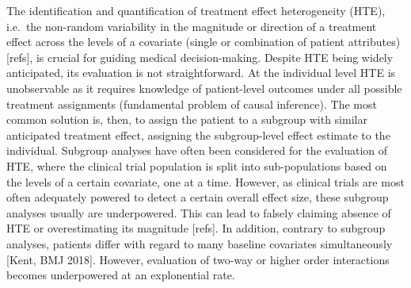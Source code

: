 \documentclass[
]{book}
\begin{document}
The identification and quantification of treatment effect heterogeneity (HTE),
i.e.~the non-random variability in the magnitude or direction of a treatment
effect across the levels of a covariate (single or combination of patient
attributes) {[}refs{]}, is crucial for guiding medical decision-making. Despite HTE
being widely anticipated, its evaluation is not straightforward. At the
individual level HTE is unobservable as it requires knowledge of patient-level
outcomes under all possible treatment assignments (fundamental problem of causal
inference). The most common solution is, then, to assign the patient to a
subgroup with similar anticipated treatment effect, assigning the subgroup-level
effect estimate to the individual. Subgroup analyses have often been considered
for the evaluation of HTE, where the clinical trial population is split into
sub-populations based on the levels of a certain covariate, one at a
time. However, as clinical trials are most often adequately powered to detect a
certain overall effect size, these subgroup analyses usually are
underpowered. This can lead to falsely claiming absence of HTE or overestimating
its magnitude {[}refs{]}. In addition, contrary to subgroup analyses, patients
differ with regard to many baseline covariates simultaneously {[}Kent, BMJ
2018{]}. However, evaluation of two-way or higher order interactions becomes
underpowered at an explonential rate.
\end{document}
